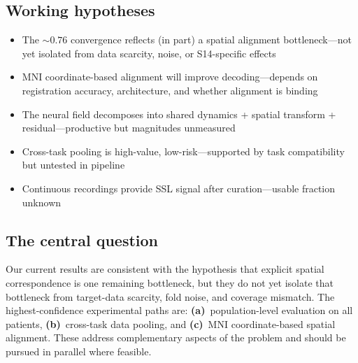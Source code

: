 \documentclass[11pt,letterpaper]{article}
\begin{document}
\subsection*{Working hypotheses}
\begin{itemize}[leftmargin=2em]
\item The ${\sim}0.76$ convergence reflects (in part) a spatial alignment bottleneck---not yet isolated from data scarcity, noise, or S14-specific effects
\item MNI coordinate-based alignment will improve decoding---depends on registration accuracy, architecture, and whether alignment is binding
\item The neural field decomposes into shared dynamics + spatial transform + residual---productive but magnitudes unmeasured
\item Cross-task pooling is high-value, low-risk---supported by task compatibility but untested in pipeline
\item Continuous recordings provide SSL signal after curation---usable fraction unknown
\end{itemize}

\subsection*{The central question}

Our current results are consistent with the hypothesis that explicit spatial correspondence is one remaining bottleneck, but they do not yet isolate that bottleneck from target-data scarcity, fold noise, and coverage mismatch. The highest-confidence experimental paths are: \textbf{(a)}~population-level evaluation on all patients, \textbf{(b)}~cross-task data pooling, and \textbf{(c)}~MNI coordinate-based spatial alignment. These address complementary aspects of the problem and should be pursued in parallel where feasible.
\end{document}

